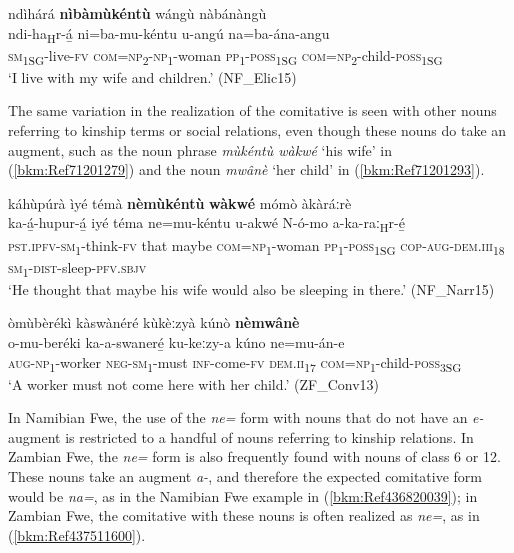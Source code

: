 \ea
\label{bkm:Ref99022109}
ndìhárá \textbf{nìbàmùkéntù} wángù nàbánàngù\\
\gll ndi-ha\textsubscript{H}r-á̲    ni=ba-mu-kéntu    u-angú  na=ba-ána-angu\\
\textsc{sm}\textsubscript{1SG}-live-\textsc{fv}  \textsc{com}=\textsc{np}\textsubscript{2}-\textsc{np}\textsubscript{1}-woman  \textsc{pp}\textsubscript{1}-\textsc{poss}\textsubscript{1SG}  \textsc{com}=\textsc{np}\textsubscript{2}-child-\textsc{poss}\textsubscript{1SG}\\
\glt ‘I live with my wife and children.’ (NF\_Elic15)
\z

The same variation in the realization of the comitative is seen with other nouns referring to kinship terms or social relations, even though these nouns do take an augment, such as the noun phrase \textit{mùkéntù wàkwé} ‘his wife’ in (\ref{bkm:Ref71201279}) and the noun \textit{mwânè} ‘her child’ in (\ref{bkm:Ref71201293}).

\ea
\label{bkm:Ref71201279}
káhùpúrà ìyé témà \textbf{nèmùkéntù} \textbf{wàkwé} mómò àkàráːrè\\
\gll ka-á̲-hupur-á̲    iyé  téma  ne=mu-kéntu  u-akwé N-ó-mo    a-ka-raː\textsubscript{H}r-é̲\\
\textsc{pst}.\textsc{ipfv}-\textsc{sm}\textsubscript{1}-think-\textsc{fv}  that  maybe  \textsc{com}=\textsc{np}\textsubscript{1}-woman  \textsc{pp}\textsubscript{1}-\textsc{poss}\textsubscript{1SG}
\textsc{cop}-\textsc{aug}-\textsc{dem}.\textsc{iii}\textsubscript{18} \textsc{sm}\textsubscript{1}-\textsc{dist}-sleep-\textsc{pfv}.\textsc{sbjv}\\
\glt ‘He thought that maybe his wife would also be sleeping in there.’ (NF\_Narr15)
\z

\ea
\label{bkm:Ref71201293}
òmùbèrékì kàswànéré kùkèːzyà kúnò \textbf{nèmwânè}\\
\gll o-mu-beréki    ka-a-swaneré̲ ku-keːzy-a  kúno    ne=mu-án-e\\
\textsc{aug}-\textsc{np}\textsubscript{1}-worker  \textsc{neg}-\textsc{sm}\textsubscript{1}-must
\textsc{inf}-come-\textsc{fv}  \textsc{dem}.\textsc{ii}\textsubscript{17} \textsc{com}=\textsc{np}\textsubscript{1}-child-\textsc{poss}\textsubscript{3SG}\\
\glt ‘A worker must not come here with her child.’ (ZF\_Conv13)
\z

In Namibian Fwe, the use of the \textit{ne=} form with nouns that do not have an \textit{e-} augment is restricted to a handful of nouns referring to kinship relations. In Zambian Fwe, the \textit{ne=} form is also frequently found with nouns of class 6 or 12. These nouns take an augment \textit{a-}, and therefore the expected comitative form would be \textit{na=}, as in the Namibian Fwe example in (\ref{bkm:Ref436820039}); in Zambian Fwe, the comitative with these nouns is often realized as \textit{ne=}, as in (\ref{bkm:Ref437511600}).

